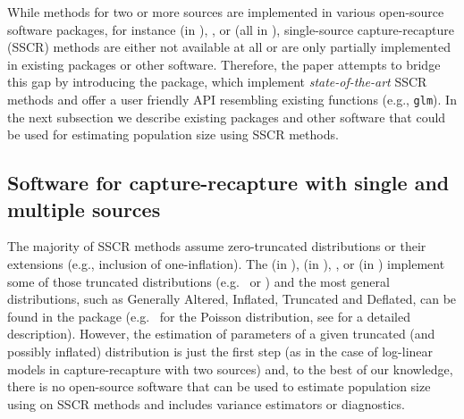 \documentclass[
]{jss}
\newcommand{\1}{\mathcal{I}} \newcommand{\bZero}{\boldsymbol{0}}
\begin{document}
While methods for two or more sources are implemented in various
open-source software packages, for instance 
\citep{yang2006care4} (in ), 
\citep{baillargeon2007rcapture},  \citep{laake2013marked} or
 \citep{yee2015vgam} (all in ), single-source
capture-recapture (SSCR) methods are either not available at all or are
only partially implemented in existing  packages or other
software. Therefore, the paper attempts to bridge this gap by
introducing the  package, which implement
\emph{state-of-the-art} SSCR methods and offer a user friendly API
resembling existing  functions (e.g., \texttt{glm}). In the
next subsection we describe existing  packages and other
software that could be used for estimating population size using SSCR
methods.

\subsection{Software for capture-recapture with single and multiple
sources}\label{sec-software}

The majority of SSCR methods assume zero-truncated distributions or
their extensions (e.g., inclusion of one-inflation). The
 \citep{Distributionsjl} (in ),
 \citep{seabold2010statsmodels} (in ),
 \citep{countreg},  \citep{VGAM-main} or
 \citep{distributions3} (in ) implement
some of those truncated distributions
(e.g.~ or )
and the most general distributions, such as Generally Altered, Inflated,
Truncated and Deflated, can be found in the  package
(e.g.~ for the Poisson distribution, see
\citet{gaitdcount} for a detailed description). However, the estimation
of parameters of a given truncated (and possibly inflated) distribution
is just the first step (as in the case of log-linear models in
capture-recapture with two sources) and, to the best of our knowledge,
there is no open-source software that can be used to estimate population
size using on SSCR methods and includes variance estimators or
diagnostics.
\end{document}
